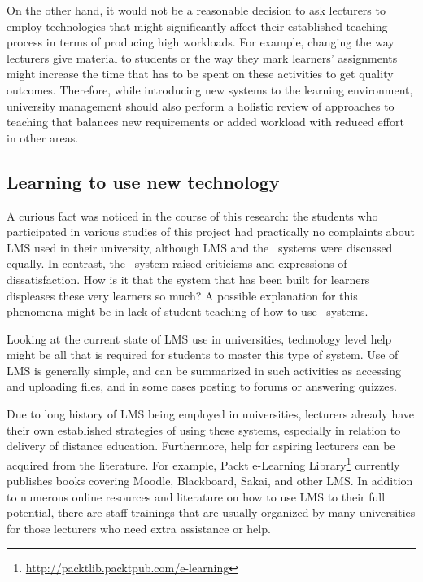 On the other hand, it would not be a reasonable decision to ask lecturers to
employ technologies that might significantly affect their established
teaching process in terms of producing high workloads. For example, changing the
way lecturers give material to students or the way they mark learners'
assignments might increase the time that has to be spent on these activities to
get quality outcomes. Therefore, while introducing new systems to the learning
environment, university management should also perform a holistic review of
approaches to teaching that balances new requirements or added workload with
reduced effort in other areas.

\subsection[Learning to Use New Technology]{Learning to use new technology}

A curious fact was noticed in the course of this research: the students who
participated in various studies of this project had practically no complaints
about LMS used in their university, although LMS and the \ep~systems were
discussed equally. In contrast, the \ep~system raised criticisms and expressions
of dissatisfaction. How is it that the system that has been built for learners
displeases these very learners so much? A possible explanation for this
phenomena might be in lack of student teaching of how to use \ep~systems.

Looking at the current state of LMS use in universities, technology level help
might be all that is required for students to master this type of system. Use of
LMS is generally simple, and can be summarized in such activities as accessing
and uploading files, and in some cases posting to forums or answering quizzes.

Due to long history of LMS being employed in universities, lecturers already
have their own established strategies of using these systems, especially in
relation to delivery of distance education. Furthermore, help for aspiring
lecturers can be acquired from the literature. For example, Packt e-Learning
Library\footnote{\url{http://packtlib.packtpub.com/e-learning}} currently
publishes books covering Moodle, Blackboard, Sakai, and other LMS. In addition
to numerous online resources and literature on how to use LMS to their full
potential, there are staff trainings that are usually organized by many
universities for those lecturers who need extra assistance or help.

